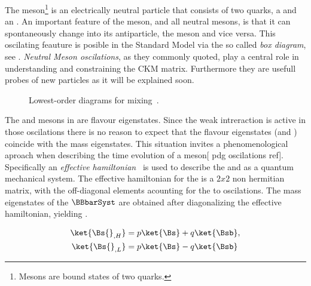

The \Bs meson\footnote{Mesons are bound states of two quarks.} is an electrically neutral
particle that consists of two quarks, a \bquarkbar and an \squark. An important feature of
the \Bs meson, and all neutral mesons, is that it can spontaneously change into its antiparticle,
the \Bsb meson and vice versa. This oscilating feauture is posible in the Standard Model via the
so called {\it box diagram}, see . {\it Neutral Meson oscilations}, as they commonly
quoted, play a central role in understanding and constraining the CKM matrix. Furthermore they are
usefull probes of new particles as it will be explained soon.

\begin{figure}[h]
  \centering
  \begin{subfigure}{0.5\textwidth}
    \centering
    {\sffamily }
    \caption{}
    \label{bs_box_1}
  \end{subfigure}%
  \begin{subfigure}{0.5\textwidth}
    \centering
    {\sffamily }
    \caption{}
    \label{bs_box_2}
  \end{subfigure}
  \caption{Lowest-order diagrams for mixing~\cite{LHCb-PAPER-2013-002}.}
  \label{bs_box}
\end{figure}

The \Bs and \Bsb mesons in  are flavour eigenstates. Since the weak intreraction
is active in those oscilations there is no reason to expect that the flavour eigenstates \Bs (and \Bsb)
coincide with the mass eigenstates. This situation invites a phenomenological
aproach when describing the time evolution of a \Bs meson[{\color{red} pdg oscilations ref}]. Specifically
an {\it effective hamiltonian}~\cite{eff-hamiltonian-bs-syst,DeBruyn-thesis} is used to describe the \Bs and \Bsb
as a quantum mechanical system. The effective hamiltonian for the \BBbarSyst is a $2x2$ non hermitian matrix,
with the off-diagonal elements acounting for the \Bs to \Bsb oscilations.
The mass eigenstates of the $\BBbarSyst$ are obtained after diagonalizing the effective hamiltonian, yielding .

\begin{align}
\ket{\Bs{}_{,H}} &= p \ket{\Bs} + q \ket{\Bsb}, \nonumber \\
\ket{\Bs{}_{,L}} &= p \ket{\Bs} - q \ket{\Bsb}
\label{bs_mass_eigen}
\end{align}

